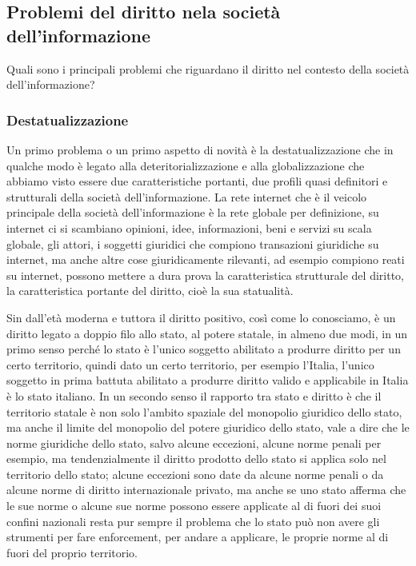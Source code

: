 \subsection{Problemi del diritto nela società dell'informazione}
Quali sono i principali problemi che riguardano il diritto nel contesto della società dell'informazione?

\subsubsection{Destatualizzazione}
Un primo problema o un primo aspetto di novità è la destatualizzazione che in qualche modo è legato alla deteritorializzazione e alla globalizzazione che abbiamo visto essere due caratteristiche portanti, due profili quasi definitori e strutturali della società dell'informazione. La rete internet che è il veicolo principale della società dell'informazione è la rete globale per definizione, su internet ci si scambiano opinioni, idee, informazioni, beni e servizi su scala globale, gli attori, i soggetti giuridici che compiono transazioni giuridiche su internet, ma anche altre cose giuridicamente rilevanti, ad esempio compiono reati su internet, possono mettere a dura prova la caratteristica strutturale del diritto, la caratteristica portante del diritto, cioè la sua statualità. \par 
Sin dall'età moderna e tuttora il diritto positivo, così come lo conosciamo, è un diritto legato a doppio filo allo stato, al potere statale, in almeno due modi, in un primo senso perché lo stato è l'unico soggetto abilitato a produrre diritto per un certo territorio, quindi dato un certo territorio, per esempio l'Italia, l'unico soggetto in prima battuta abilitato a produrre diritto valido e applicabile in Italia è lo stato italiano. 
In un secondo senso il rapporto tra stato e diritto è che il territorio statale è non solo l'ambito spaziale del monopolio giuridico dello stato, ma anche il limite del monopolio del potere giuridico dello stato, vale a dire che le norme giuridiche dello stato, salvo alcune eccezioni, alcune norme penali per esempio, ma tendenzialmente il diritto prodotto dello stato si applica solo nel territorio dello stato; alcune eccezioni sono date da alcune norme penali  o da alcune norme di diritto internazionale privato, ma anche se uno stato afferma che le sue norme o alcune sue norme possono essere applicate al di fuori dei suoi confini nazionali resta pur sempre il problema che lo stato può non avere gli strumenti per fare enforcement, per andare a applicare,  le proprie norme al di fuori del proprio territorio.

